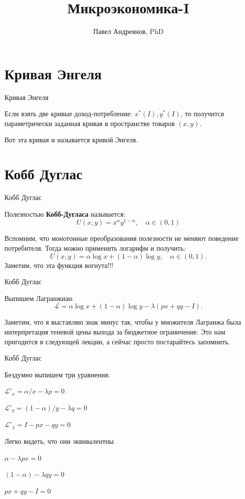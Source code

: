 \documentclass{beamer}
\title{
Микроэкономика-I
}
\author{
Павел Андреянов, PhD
}
\begin{document}
\maketitle

\section{Кривая Энгеля}

\begin{frame}{Кривая Энгеля}

Если взять две кривые доход-потребление: $x^{\ast}(I), y^{\ast}(I)$, то получится параметрически заданная кривая в пространстве товаров $(x,y)$. 

Вот эта кривая и называется кривой Энгеля.

\end{frame}

\section{Кобб Дуглас}

\begin{frame}{Кобб Дуглас}

\begin{definition}
Полезностью \textbf{Кобб-Дугласа} называется:
$$U(x, y) = x^{\alpha} y^{1-\alpha}, \quad \alpha \in (0,1)$$  
\end{definition}

Вспомним, что монотонные преобразования полезности не меняют поведение потребителя. Тогда можно применить логарифм и получить:
$$ U(x, y) = \alpha \log x + (1-\alpha) \log y, \quad \alpha \in (0,1).$$ 
Заметим, что эта функция вогнута!!! 
\end{frame}

\begin{frame}{Кобб Дуглас}

Выпишем Лагранжиан:
$$ \mathcal{L} = \alpha \log x + (1-\alpha) \log y - \lambda (px + qy -I).$$ 

Заметим, что я выставляю знак минус так, чтобы у множителя Лагранжа была интерпретация теневой цены выхода за бюджетное ограничение. Это нам пригодится в следующей лекции, а сейчас просто постарайтесь запомнить.
\end{frame}

\begin{frame}{Кобб Дуглас}

Бездумно выпишем три уравнения:

$\mathcal{L}'_x = \alpha/ x - \lambda p = 0$

$\mathcal{L}'_y = (1-\alpha)/y - \lambda q = 0$

$\mathcal{L}'_{\lambda} = I - p x - qy = 0$

Легко видеть, что они эквивалентны

$\alpha - \lambda p x= 0$

$(1-\alpha) - \lambda q y= 0$

$px + qy - I = 0$

\end{frame}
\end{document}
